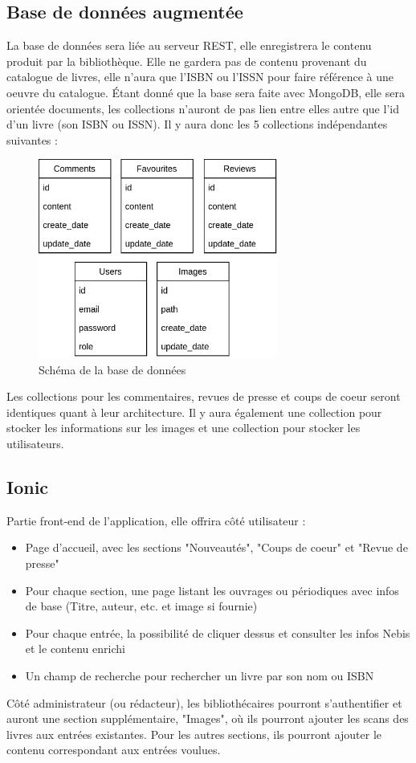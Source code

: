 \documentclass[a4paper, 12pt]{article}
\begin{document}
\subsection{Base de données augmentée}
La base de données sera liée au serveur REST, elle enregistrera le contenu produit par la bibliothèque. Elle ne gardera pas
de contenu provenant du catalogue de livres, elle n'aura que l'ISBN ou l'ISSN pour faire référence à une oeuvre du catalogue.
Étant donné que la base sera faite avec MongoDB, elle sera orientée documents, les collections n'auront de pas lien entre elles
autre que l'id d'un livre (son ISBN ou ISSN). Il y aura donc les 5 collections indépendantes suivantes :
\begin{figure}
    \begin{center}
        \includegraphics[width=0.7\textwidth]{images/bdd.png}
    \end{center}
    \caption{Schéma de la base de données}
\end{figure}
Les collections pour les commentaires, revues de presse et coups de coeur seront identiques quant à leur architecture. Il y
aura également une collection pour stocker les informations sur les images et une collection pour stocker les utilisateurs.

\subsection{Ionic}
Partie front-end de l'application, elle offrira côté utilisateur :
\begin{itemize}
    \item Page d'accueil, avec les sections "Nouveautés", "Coups de coeur" et "Revue de presse"
    \item Pour chaque section, une page listant les ouvrages ou périodiques avec infos de base
        (Titre, auteur, etc. et image si fournie)
    \item Pour chaque entrée, la possibilité de cliquer dessus et consulter les infos Nebis et le contenu enrichi
    \item Un champ de recherche pour rechercher un livre par son nom ou ISBN
\end{itemize}
Côté administrateur (ou rédacteur), les bibliothécaires pourront s'authentifier et auront une section supplémentaire,
"Images", où ils pourront ajouter les scans des livres aux entrées existantes. Pour les autres sections, ils
pourront ajouter le contenu correspondant aux entrées voulues.
\end{document}
